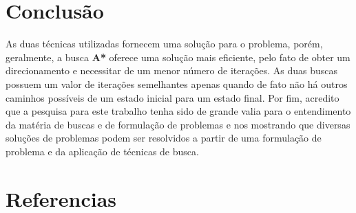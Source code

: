 \documentclass[12pt]{article}
\begin{document}
\section{Conclusão}
As duas técnicas utilizadas fornecem uma solução para o problema, porém, geralmente, a busca \textbf{A*} oferece uma solução mais eficiente, pelo fato de obter um direcionamento e necessitar de um menor número de iterações. As duas buscas possuem um valor de iterações semelhantes apenas quando de fato não há outros caminhos possíveis de um estado inicial para um estado final.
Por fim, acredito que a pesquisa para este trabalho tenha sido de grande valia para o entendimento da matéria de buscas e de formulação de problemas e nos mostrando que diversas soluções de problemas podem ser resolvidos a partir de uma formulação de problema e da aplicação de técnicas de busca.




\section{Referencias}
\cite{Russel:09}


\end{document}
